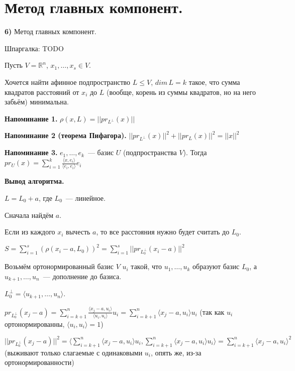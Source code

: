 \section{
Метод главных компонент.
}

{\bf 6)} Метод главных компонент.

Шпаргалка: TODO

Пусть $V = \mathbb{R}^n$, $x_1,\ldots, x_s \in V$.

Хочется найти афинное подпространство $L\le V$, $dim\,L = k$ такое, что сумма квадратов расстояний от $x_i$ до $L$ (вообще, корень из суммы квадратов, но на него забьём) минимальна.

{\bf Напоминание 1.} $\rho(x, L) = ||pr_{L^{\perp}}(x)||$

{\bf Напоминание 2 (теорема Пифагора).} $||pr_{L^{\perp}}(x)||^2 + ||pr_L(x)||^2 = ||x||^2$

{\bf Напоминание 3.} $e_1,\ldots,e_k$~--- базис $U$ (подпространства $V$). Тогда $pr_U(x)=\sum\limits_{i=1}^k\frac{\langle x, e_i\rangle}{\langle e_i, e_i\rangle}e_i$

{\bf Вывод алгоритма.}

$L = L_0 + a$, где $L_0$~--- линейное. 

Сначала найдём $a$.


\proofname

Если из каждого $x_i$ вычесть $a$, то все расстояния нужно будет считать до $L_0$.

$S = \sum\limits_{i = 1}^s (\rho(x_i-a, L_0))^2 = \sum\limits_{i = 1}^s ||pr_{L_0^{\perp}}(x_i-a)||^2$

Возьмём ортонормированный базис $V$ $u_i$ такой, что $u_1,\ldots, u_k$ образуют базис $L_0$, а $u_{k+1},\ldots,u_n$~--- дополнение до базиса.

$L_0^\perp = \langle u_{k+1},\ldots,u_n\rangle$. 

$pr_{L_0^{\perp}}(x_j-a) = \sum\limits_{i = k + 1}^n \frac{\langle x_j - a, u_i\rangle}{\langle u_i, u_i\rangle}u_i = \sum\limits_{i = k + 1}^n \langle x_j - a, u_i\rangle u_i$ (так как $u_i$ ортонормированны, $\langle u_i, u_i\rangle = 1$)

$||pr_{L_0^{\perp}}(x_j-a)||^2 = \langle\sum\limits_{i = k + 1}^n \langle x_j - a, u_i\rangle u_i, \sum\limits_{i = k + 1}^n \langle x_j - a, u_i\rangle u_i\rangle = \sum\limits_{i = k + 1}^n \langle x_j - a, u_i\rangle^2$ (выживают только слагаемые с одинаковыми $u_i$, опять же, из-за ортонормированности)

